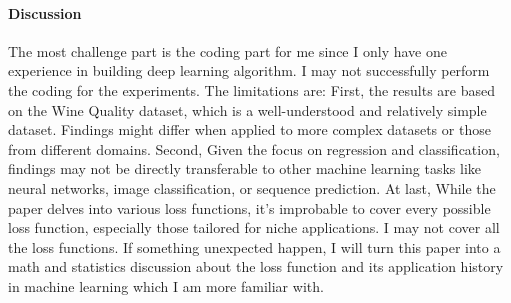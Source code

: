 \documentclass[12pt]{article}
\begin{document}
\paragraph{Discussion}
The most challenge part is the coding part for me since I only have one experience in building deep learning algorithm. I may not successfully perform the coding for the experiments. 
The limitations are: 
First, the results are based on the Wine Quality dataset, which is a well-understood and relatively simple dataset. Findings might differ when applied to more complex datasets or those from different domains.
Second, Given the focus on regression and classification, findings may not be directly transferable to other machine learning tasks like neural networks, image classification, or sequence prediction.
At last, While the paper delves into various loss functions, it's improbable to cover every possible loss function, especially those tailored for niche applications. I may not cover all the loss functions.
If something unexpected happen, I will turn this paper into a math and statistics discussion about the loss function and its application history in machine learning which I am more familiar with.



\end{document}
